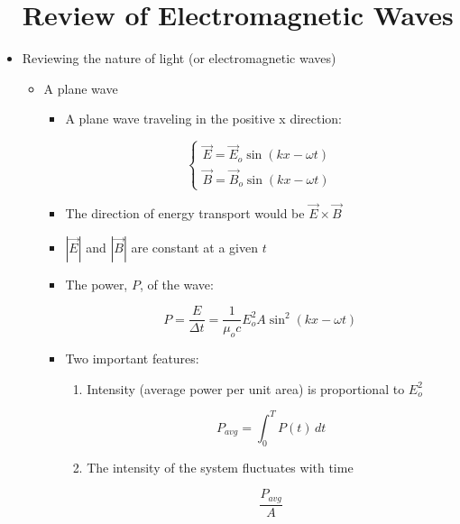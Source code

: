 \begin{itemize}

    \section{Review of Electromagnetic Waves}

  \item Reviewing the nature of light (or electromagnetic waves)

    \begin{itemize}

      \item A plane wave

        \begin{itemize}

          \item A plane wave traveling in the positive x direction:

            $$\left\{\begin{array}{c} \vec{E}=\vec{E}_o\sin(kx-\omega t)\\\vec{B}=\vec{B}_o\sin(kx-\omega t) \end{array}$$

            \item The direction of energy transport would be $\vec{E}\times\vec{B}$

            \item $|\vec{E}|$ and $|\vec{B}|$ are constant at a given $t$

            \item The power, $P$, of the wave:

              $$P=\frac{E}{\Delta t}=\frac{1}{\mu_oc}E_o^2A\sin^2(kx-\omega t)$$

            \item Two important features:

              \begin{enumerate}

                \item Intensity (average power per unit area) is proportional to $E_o^2$

                  $$P_{avg}=\int_0^T P(t)\,dt$$

                \item  The intensity of the system fluctuates with time

                  $$\frac{P_{avg}}{A}$$

              \end{enumerate}


\end{itemize}
\end{itemize}
\end{itemize}
